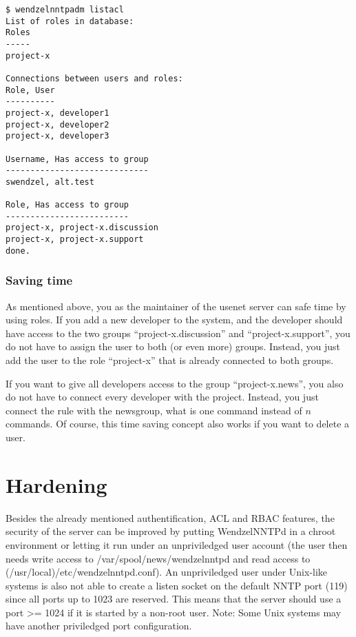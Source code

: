 \begin{verbatim}
$ wendzelnntpadm listacl
List of roles in database:
Roles
-----
project-x

Connections between users and roles:
Role, User
----------
project-x, developer1
project-x, developer2
project-x, developer3

Username, Has access to group
-----------------------------
swendzel, alt.test

Role, Has access to group
-------------------------
project-x, project-x.discussion
project-x, project-x.support
done.
\end{verbatim}

\subsubsection{Saving time}

As mentioned above, you as the maintainer of the usenet server can safe time by using roles. If you add a new developer to the system, and the developer should have access to the two groups ``project-x.discussion'' and ``project-x.support'', you do not have to assign the user to both (or even more) groups. Instead, you just add the user to the role ``project-x'' that is already connected to both groups.

If you want to give all developers access to the group ``project-x.news'', you also do not have to connect every developer with the project. Instead, you just connect the rule with the newsgroup, what is one command instead of $n$ commands. Of course, this time saving concept also works if you want to delete a user.

\section{Hardening}

Besides the already mentioned authentification, ACL and RBAC features, the security of the server can be improved by putting WendzelNNTPd in a chroot environment or letting it run under an unpriviledged user account (the user then needs write access to /var/spool/news/wendzelnntpd and read access to (/usr/local)/etc/wendzelnntpd.conf). An unpriviledged user under Unix-like systems is also not able to create a listen socket on the default NNTP port (119) since all ports up to 1023 are reserved. This means that the server should use a port >= 1024 if it is started by a non-root user. Note: Some Unix systems may have another priviledged port configuration. 



